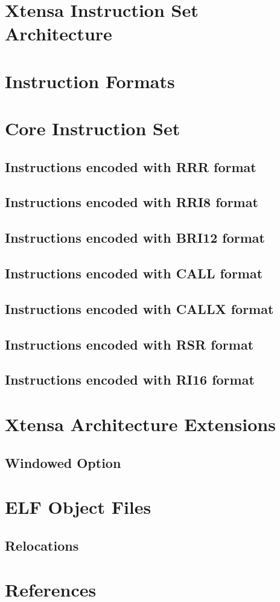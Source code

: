 \documentclass[oneside,11pt]{book}
\begin{document}
	
\chapter*{Xtensa Instruction Set Architecture}



\chapter*{Instruction Formats}



\chapter*{Core Instruction Set}

\section*{Instructions encoded with RRR format}

\section*{Instructions encoded with RRI8 format}

\section*{Instructions encoded with BRI12 format}

\section*{Instructions encoded with CALL format}

\section*{Instructions encoded with CALLX format}

\section*{Instructions encoded with RSR format}

\section*{Instructions encoded with RI16 format}


\chapter*{Xtensa Architecture Extensions}

\section*{Windowed Option}


\chapter*{ELF Object Files}
\section*{Relocations}


\chapter*{References}

\end{document}
